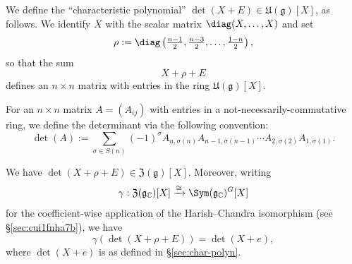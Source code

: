 We define the ``characteristic polynomial'' $\det(X+E) \in \mathfrak{U}(\mathfrak{g})[X]$, as follows.  We identify $X$ with the scalar matrix $\diag(X,\dotsc,X)$ and set
\[
  \rho := \diag \left( \tfrac{n-1}{2}, \tfrac{n-3}{2}, \dotsc , \tfrac{1-n}{2} \right),
\]
so that the sum
\[
  X + \rho + E
\]
defines an $n \times n$ matrix with entries in the ring $\mathfrak{U}(\mathfrak{g})[X]$.

For an $n \times n$ matrix $A = (A_{i j})$ with entries in a not-necessarily-commutative ring, we define the determinant via the following convention:
\begin{equation}\label{eq:cui1foghl9}
  \det(A) := \sum_{\sigma \in S(n)} (-1)^\sigma A_{n,\sigma(n)} A_{n-1,\sigma(n-1)} \dotsb A_{2,\sigma(2)} A_{1,\sigma(1)}.
\end{equation}
\begin{lemma}\label{lemma:cui1foa3up}
  We have $\det(X + \rho + E) \in \mathfrak{Z}(\mathfrak{g})[X]$.  Moreover, writing
  \begin{equation*}
    \gamma : \mathfrak{Z}(\mathfrak{g}_\mathbb{C})[X] \xrightarrow{\cong } \Sym(\mathfrak{g}_\mathbb{C})^G[X]
  \end{equation*}
  for the coefficient-wise application of the Harish--Chandra isomorphism (see \S\ref{sec:cui1fnha7b}), we have
  \begin{equation}\label{eq:cui1fohnhu}
    \gamma(\det(X + \rho + E)) = \det(X + e),
  \end{equation}
  where $\det(X + e)$ is as defined in \S\ref{sec:char-polyn}.
\end{lemma}
